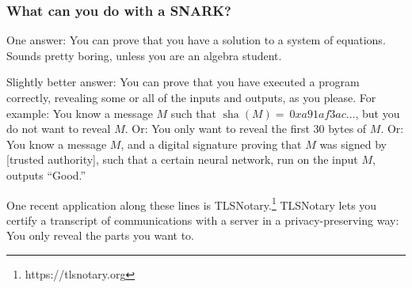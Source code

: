 \subsubsection{What can you do with a SNARK?}

One answer: You can prove that you have a solution to a system of
equations. Sounds pretty boring, unless you are an algebra student.

Slightly better answer: You can prove that you have executed a program
correctly, revealing some or all of the inputs and outputs, as you
please. For example: You know a message \(M\) such that
\(\operatorname{sha}(M) = \ 0xa91af3ac...\), but you do not want to
reveal \(M\). Or: You only want to reveal the first 30 bytes of \(M\).
Or: You know a message \(M\), and a digital signature proving that \(M\)
was signed by [trusted authority], such that a certain neural
network, run on the input \(M\), outputs ``Good.''

One recent application along these lines is TLSNotary.\footnote{https://tlsnotary.org}
TLSNotary lets you certify a transcript of communications with a server
in a privacy-preserving way: You only reveal the parts you want to.
